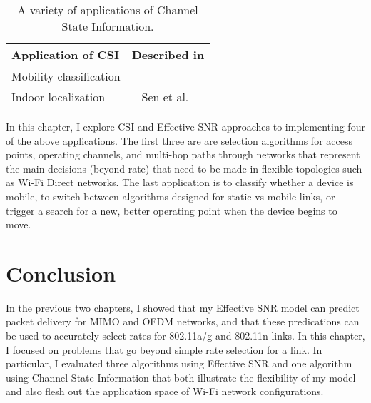 \begin{table}[htp]
	\centering
	\begin{tabular}{lc}
	\toprule
		\textbf{Application of CSI} & \textbf{Described in} \\
	\midrule
		Mobility classification & \secref{sec:esnr_mobility}\\
		Indoor localization & Sen et al.~\cite{Sen_PinLoc,Sen_SpinLoc} \\ 
	\bottomrule
	\end{tabular}
	\caption[A variety of applications of Channel State Information]{\label{tab:csi_uses}A variety of applications of Channel State Information.}
\end{table}

In this chapter, I explore CSI and Effective SNR approaches to implementing four of the above applications. The first three are are selection algorithms for access points, operating channels, and multi-hop paths through networks that represent the main decisions (beyond rate) that need to be made in flexible topologies such as Wi-Fi Direct networks. The last application is to classify whether a device is mobile, to switch between algorithms designed for static vs mobile links, or trigger a search for a new, better operating point when the device begins to move.






\section{Conclusion}
In the previous two chapters, I showed that my Effective SNR model can predict packet delivery for MIMO and OFDM networks, and that these predications can be used to accurately select rates for 802.11a/g and 802.11n links. In this chapter, I focused on problems that go beyond simple rate selection for a link. In particular, I evaluated three algorithms using Effective SNR and one algorithm using Channel State Information that both illustrate the flexibility of my model and also flesh out the application space of Wi-Fi network configurations.

